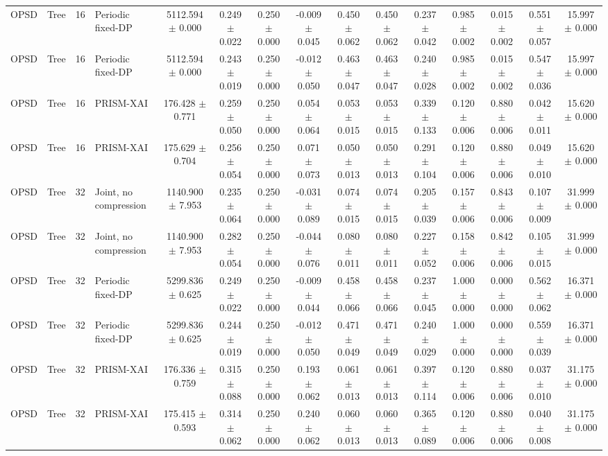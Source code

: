 \begin{tabular}{llllccccccccccc}
OPSD & Tree & 16 & Periodic fixed-DP & 5112.594 $\pm$ 0.000 & 0.249 $\pm$ 0.022 & 0.250 $\pm$ 0.000 & -0.009 $\pm$ 0.045 & 0.450 $\pm$ 0.062 & 0.450 $\pm$ 0.062 & 0.237 $\pm$ 0.042 & 0.985 $\pm$ 0.002 & 0.015 $\pm$ 0.002 & 0.551 $\pm$ 0.057 & 15.997 $\pm$ 0.000 \\
OPSD & Tree & 16 & Periodic fixed-DP & 5112.594 $\pm$ 0.000 & 0.243 $\pm$ 0.019 & 0.250 $\pm$ 0.000 & -0.012 $\pm$ 0.050 & 0.463 $\pm$ 0.047 & 0.463 $\pm$ 0.047 & 0.240 $\pm$ 0.028 & 0.985 $\pm$ 0.002 & 0.015 $\pm$ 0.002 & 0.547 $\pm$ 0.036 & 15.997 $\pm$ 0.000 \\
OPSD & Tree & 16 & PRISM-XAI & 176.428 $\pm$ 0.771 & 0.259 $\pm$ 0.050 & 0.250 $\pm$ 0.000 & 0.054 $\pm$ 0.064 & 0.053 $\pm$ 0.015 & 0.053 $\pm$ 0.015 & 0.339 $\pm$ 0.133 & 0.120 $\pm$ 0.006 & 0.880 $\pm$ 0.006 & 0.042 $\pm$ 0.011 & 15.620 $\pm$ 0.000 \\
OPSD & Tree & 16 & PRISM-XAI & 175.629 $\pm$ 0.704 & 0.256 $\pm$ 0.054 & 0.250 $\pm$ 0.000 & 0.071 $\pm$ 0.073 & 0.050 $\pm$ 0.013 & 0.050 $\pm$ 0.013 & 0.291 $\pm$ 0.104 & 0.120 $\pm$ 0.006 & 0.880 $\pm$ 0.006 & 0.049 $\pm$ 0.010 & 15.620 $\pm$ 0.000 \\
OPSD & Tree & 32 & Joint, no compression & 1140.900 $\pm$ 7.953 & 0.235 $\pm$ 0.064 & 0.250 $\pm$ 0.000 & -0.031 $\pm$ 0.089 & 0.074 $\pm$ 0.015 & 0.074 $\pm$ 0.015 & 0.205 $\pm$ 0.039 & 0.157 $\pm$ 0.006 & 0.843 $\pm$ 0.006 & 0.107 $\pm$ 0.009 & 31.999 $\pm$ 0.000 \\
OPSD & Tree & 32 & Joint, no compression & 1140.900 $\pm$ 7.953 & 0.282 $\pm$ 0.054 & 0.250 $\pm$ 0.000 & -0.044 $\pm$ 0.076 & 0.080 $\pm$ 0.011 & 0.080 $\pm$ 0.011 & 0.227 $\pm$ 0.052 & 0.158 $\pm$ 0.006 & 0.842 $\pm$ 0.006 & 0.105 $\pm$ 0.015 & 31.999 $\pm$ 0.000 \\
OPSD & Tree & 32 & Periodic fixed-DP & 5299.836 $\pm$ 0.625 & 0.249 $\pm$ 0.022 & 0.250 $\pm$ 0.000 & -0.009 $\pm$ 0.044 & 0.458 $\pm$ 0.066 & 0.458 $\pm$ 0.066 & 0.237 $\pm$ 0.045 & 1.000 $\pm$ 0.000 & 0.000 $\pm$ 0.000 & 0.562 $\pm$ 0.062 & 16.371 $\pm$ 0.000 \\
OPSD & Tree & 32 & Periodic fixed-DP & 5299.836 $\pm$ 0.625 & 0.244 $\pm$ 0.019 & 0.250 $\pm$ 0.000 & -0.012 $\pm$ 0.050 & 0.471 $\pm$ 0.049 & 0.471 $\pm$ 0.049 & 0.240 $\pm$ 0.029 & 1.000 $\pm$ 0.000 & 0.000 $\pm$ 0.000 & 0.559 $\pm$ 0.039 & 16.371 $\pm$ 0.000 \\
OPSD & Tree & 32 & PRISM-XAI & 176.336 $\pm$ 0.759 & 0.315 $\pm$ 0.088 & 0.250 $\pm$ 0.000 & 0.193 $\pm$ 0.062 & 0.061 $\pm$ 0.013 & 0.061 $\pm$ 0.013 & 0.397 $\pm$ 0.114 & 0.120 $\pm$ 0.006 & 0.880 $\pm$ 0.006 & 0.037 $\pm$ 0.010 & 31.175 $\pm$ 0.000 \\
OPSD & Tree & 32 & PRISM-XAI & 175.415 $\pm$ 0.593 & 0.314 $\pm$ 0.062 & 0.250 $\pm$ 0.000 & 0.240 $\pm$ 0.062 & 0.060 $\pm$ 0.013 & 0.060 $\pm$ 0.013 & 0.365 $\pm$ 0.089 & 0.120 $\pm$ 0.006 & 0.880 $\pm$ 0.006 & 0.040 $\pm$ 0.008 & 31.175 $\pm$ 0.000 \\
\bottomrule
\end{tabular}
